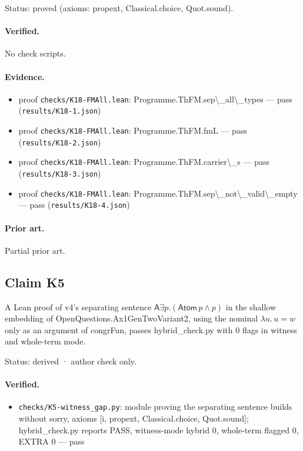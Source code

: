 \documentclass{article}
\begin{document}
Status: proved (axioms: propext, Classical.choice, Quot.sound).

\paragraph{Verified.}
No check scripts.

\paragraph{Evidence.}
\begin{itemize}
\item proof \texttt{checks/K18-FMAll.lean}: Programme.ThFM.sep\textbackslash{}\_all\textbackslash{}\_types --- pass (\texttt{results/K18-1.json})
\item proof \texttt{checks/K18-FMAll.lean}: Programme.ThFM.fmL --- pass (\texttt{results/K18-2.json})
\item proof \texttt{checks/K18-FMAll.lean}: Programme.ThFM.carrier\textbackslash{}\_s --- pass (\texttt{results/K18-3.json})
\item proof \texttt{checks/K18-FMAll.lean}: Programme.ThFM.sep\textbackslash{}\_not\textbackslash{}\_valid\textbackslash{}\_empty --- pass (\texttt{results/K18-4.json})
\end{itemize}

\paragraph{Prior art.} Partial prior art.

\subsection*{Claim K5}

A Lean proof of v4's separating sentence $\mathsf A\exists p.(\mathsf{Atom}\,p\wedge p)$ in the shallow embedding of OpenQuestions.Ax1GenTwoVariant2, using the nominal $\lambda u.\,u=w$ only as an argument of congrFun, passes hybrid\_check.py with 0 flags in witness and whole-term mode.

Status: derived · author check only.

\paragraph{Verified.}
\begin{itemize}
\item \texttt{checks/K5-witness\_gap.py}: module proving the separating sentence builds without sorry, axioms [i, propext, Classical.choice, Quot.sound]; hybrid\_check.py reports PASS, witness-mode hybrid 0, whole-term flagged 0, EXTRA 0 --- pass
\end{itemize}
\end{document}
